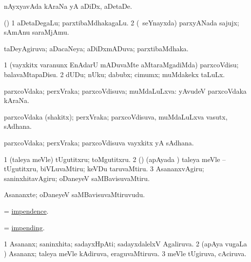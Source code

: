 \noindent
\gl{\pagu}
\bmng
{}   nAyxyavAda kAraNa yA aDiDx, aDetaDe. 
\emng
\eentry

\bentry
{}
\gl{\nA}
\bmng
(\bava) 
\bnum
\num{1} aDetaDegaLu; parxtibaMdhakagaLu. 
\num{2} (\kanmu\ seYnayxda) parxyANada sajujx; sAmAnu saraMjAmu. 
\enum
\emng
\eentry

\bentry
{}
\gl{\gu}
\bmng
taDeyAgiruva; aDacaNeya; aDiDxmADuva; parxtibaMdhaka. 
\emng
\eentry

\bentry
{}
\gl{\sakirx}
\bmng
\bnum
\num{1} (vayxkitx \mo varanunx EnAdarU mADuvaMte aMtaraMgadiMda) parxcoVdisu; balavaMtapaDisu. 
\num{2} dUDu; nUku; dabubx; cimumx; muMdakekx taLuLx. 
\enum
\emng
\eentry

\bentry
{}
\gl{\gu}
\bmng
parxcoVdaka; perxVraka; parxcoVdisuva; muMdaLuLxva:  yAvudeV parxcoVdaka kAraNa. 
\emng
\eentry

\bentry
{}
\gl{\nA}
\bmng
parxcoVdaka (shakitx); perxVraka; parxcoVdisuva, muMdaLuLxva vasutx, sAdhana. 
\emng
\eentry

\bentry
{}
\gl{\nA}
\bmng
parxcoVdaka; perxVraka; parxcoVdisuva vayxkitx yA sAdhana. 
\emng
\eentry

\bentry
{}
\gl{\akirx}
\bmng
\bnum
\num{1} (taleya meVle) tUgutitxru; toMgutitxru. 
\num{2} (\rUpa) (apAyada \vi) taleya meVle -- tUgutitxru, biVLuvaMtiru; keVDu taruvaMtiru. 
\num{3} AsananxvAgiru; saninxhitavAgiru; oDaneyeV saMBavisuvaMtiru. 
\enum
\emng
\eentry

\bentry
{}
\gl{\nA}
\bmng
Asananxte; oDaneyeV saMBavisuvaMtiruvudu. 
\emng
\eentry

\bentry
{}
\gl{\nA}
\bmng
 = \hyperlink{impendence}{impendence}. 
\emng
\eentry

\bentry
{}
\gl{\gu}
\bmng
 = \hyperlink{impending}{impending}. 
\emng
\eentry

\bentry
{}
\gl{\gu}
\bmng
\bnum
\num{1} Asananx; saninxhita; sadayxHpAti; sadayxdalelxV Agaliruva. 
\num{2} (apAya \mo vugaLa \vi) Asananx; taleya meVle kAdiruva, eraguvaMtiruva. 
\num{3} meVle tUgiruva, cAciruva. 
\enum
\emng
\eentry

